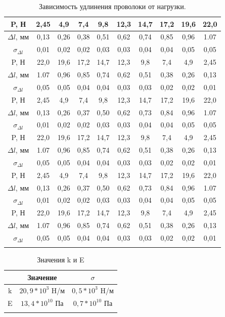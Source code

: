 \documentclass[a4paper, 12pt]{article}%
\begin{document}
\begin{longtable}{|c|c|c|c|c|c|c|c|c|c|}
				\hline
				P, Н & 2,45 &4,9 &7,4&9,8 &12,3 &14,7 &17,2 &19,6 &22,0 \\
				\hline
				$\Delta l$, мм&0,13 &0,26&	0,38&	0,51&	0,62&	0,74&	0,85& 0,96&	1.07
				\\ 
				\hline
				$\sigma_{\Delta l}$&0,01&	0,02&	0,02&	0,03&	0,03&	0,04&	0,04&	0,05&	0,05
				\\
				\hline
				\hline
				P, Н   &22,0&19,6  &17,2  &14,7&12,3&9,8&7,4 &4,9 &2,45\\
				\hline
				$\Delta l$, мм &1.07 &0,96 &0,85 &0,74 &0,62 &0,51 &0,38 &0,26 &0,13\\
				\hline
				$\sigma_{\Delta l}$&	0,05&	0,05&	0,04&	0,04&	0,03&	0,03&	0,02&	0,02&0,01 \\
				\hline
				\hline
				P, Н & 2,45 &4,9 &7,4&9,8 &12,3 &14,7 &17,2 &19,6 &22,0 \\
				\hline
				$\Delta l$, мм&0,13 &0,26&	0,37&	0,50&	0,62&	0,73&	0,84& 0,96&	1.07
				\\ 
				\hline
				$\sigma_{\Delta l}$&0,01&	0,02&	0,02&	0,03&	0,03&	0,04&	0,04&	0,05&	0,05
				\\
				\hline
				\hline
				P, Н   &22,0&19,6  &17,2  &14,7&12,3&9,8&7,4 &4,9 &2,45\\
				\hline
				$\Delta l$, мм&1.07 &0,96 &0,85 &0,74 &0,62 &0,51 &0,38 &0,26 &0,13\\
				\hline
				$\sigma_{\Delta l}$&	0,05&	0,05&	0,04&	0,04&	0,03&	0,03&	0,02&	0,02&0,01 \\
				\hline
				\hline
				P, Н & 2,45 &4,9 &7,4&9,8 &12,3 &14,7 &17,2 &19,6 &22,0 \\
				\hline
				$\Delta l$, мм&0,13 &0,26&	0,37&	0,50&	0,62&	0,73&	0,84& 0,96&	1.07
				\\ 
				\hline
				$\sigma_{\Delta l}$&0,01&	0,02&	0,02&	0,03&	0,03&	0,04&	0,04&	0,05&	0,05
				\\
				\hline
				\hline
				P, Н   &22,0&19,6  &17,2  &14,7&12,3&9,8&7,4 &4,9 &2,45\\
				\hline
				$\Delta l$, мм&1.07 &0,96 &0,85 &0,74 &0,62 &0,51 &0,38 &0,26 &0,13\\
				\hline
				$\sigma_{\Delta l}$&	0,05&	0,05&	0,04&	0,04&	0,03&	0,03&	0,02&	0,02&0,01\\
				\hline
				\caption{Зависимость удлинения проволоки от нагрузки.}
			\end{longtable}	
		
	\begin{longtable}{|c|c|c|}
				\hline
				&Значение&$\sigma$\\
				\hline
				k&$20, 9*10^3$ H/м&$0,5*10^3$ H/м\\
				\hline
				E&$13,4*10^{10}$ Па&$ 0,7*10^{10}$ Па\\
				\hline
				\caption{Значения k и E}
				\end{longtable}	
		
\end{document}
